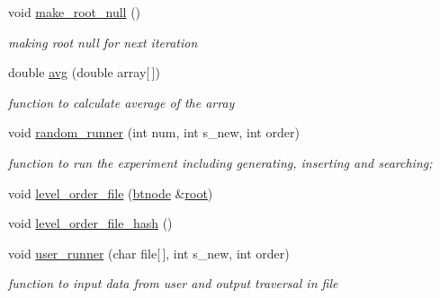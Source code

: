 \begin{DoxyCompactItemize}
void \hyperlink{class_btreehash_1_1utility_a64dcb2425033c0b70065fc11fe508d6d}{make\-\_\-root\-\_\-null} ()
\begin{DoxyCompactList}\small\item\em making root null for next iteration \end{DoxyCompactList}\item 
double \hyperlink{class_btreehash_1_1utility_af4e5007e2d501408501a75b276e60ee9}{avg} (double array\mbox{[}$\,$\mbox{]})
\begin{DoxyCompactList}\small\item\em function to calculate average of the array \end{DoxyCompactList}\item 
void \hyperlink{class_btreehash_1_1utility_abada7022304f62e821c604457a6f2d2e}{random\-\_\-runner} (int num, int s\-\_\-new, int order)
\begin{DoxyCompactList}\small\item\em function to run the experiment including generating, inserting and searching; \end{DoxyCompactList}\item 
void \hyperlink{class_btreehash_1_1utility_a536a94662cfb616df63fe9019c3a400d}{level\-\_\-order\-\_\-file} (\hyperlink{namespace_btreehash_ac7db8bb3c794c446de540bf6a03955bc}{btnode} \&\hyperlink{class_btreehash_1_1utility_ab36d736ef77e71394c00e2fa90865a69}{root})
\item 
void \hyperlink{class_btreehash_1_1utility_a0ba7dbd40de0dc7db6fff65f198066c5}{level\-\_\-order\-\_\-file\-\_\-hash} ()
\item 
void \hyperlink{class_btreehash_1_1utility_aaa36b0a18cea66805c8a19074eb628e2}{user\-\_\-runner} (char file\mbox{[}$\,$\mbox{]}, int s\-\_\-new, int order)
\begin{DoxyCompactList}\small\item\em function to input data from user and output traversal in file \end{DoxyCompactList}\end{DoxyCompactItemize}
